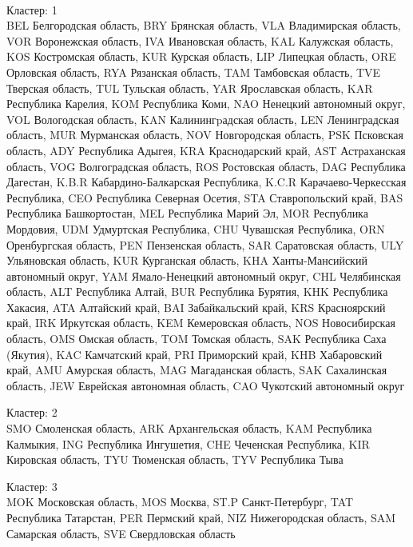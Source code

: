 \documentclass[11pt]{article}
\begin{document}
    \begin{center}
    \end{center}
    { \hspace*{\fill} \\}
    
Кластер:  1 \\
BEL Белгородская область, BRY Брянская область, VLA Владимирская область, VOR Воронежская область, IVA Ивановская область, KAL Калужская область, KOS Костромская область, KUR Курская область, LIP Липецкая область, ORE Орловская область, RYA Рязанская область, TAM Тамбовская область, TVE Тверская область, TUL Тульская область, YAR Ярославская область, KAR Республика Карелия, KOM Республика Коми, NAO Ненецкий автономный округ, VOL Вологодская область, KAN Калинингpадская область, LEN Ленинградская область, MUR Мурманская область, NOV Новгородская область, PSK Псковская область, ADY Республика Адыгея, KRA Краснодарский край, AST Астраханская область, VOG Волгоградская область, ROS Ростовская область, DAG Республика Дагестан, K.B.R Кабардино-Балкарская Республика, K.C.R Карачаево-Черкесская Республика, CEO Республика Северная Осетия, STA Ставропольский край, BAS Республика Башкортостан, MEL Республика Марий Эл, MOR Республика Мордовия, UDM Удмуртская Республика, CHU Чувашская Республика, ORN Оренбургская область, PEN Пензенская область, SAR Саратовская область, ULY Ульяновская область, KUR Курганская область, KHA Ханты-Мансийский автономный округ, YAM Ямало-Ненецкий автономный округ, CHL Челябинская область, ALT Республика Алтай, BUR Республика Бурятия, KHK Республика Хакасия, ATA Алтайский край, BAI Забайкальский край, KRS Красноярский край, IRK Иркутская область, KEM Кемеровская область, NOS Новосибирская область, OMS Омская область, TOM Томская область, SAK Республика Саха (Якутия), KAC Камчатский край, PRI Приморский край, KHB Хабаровский край, AMU Амурская область, MAG Магаданская область, SAK Сахалинская область, JEW Еврейская автономная область, CAO Чукотский автономный округ

Кластер:  2 \\
SMO Смоленская область, ARK Архангельская область, KAM Республика Калмыкия, ING Республика Ингушетия, CHE Чеченская Республика, KIR Кировская область, TYU Тюменская область, TYV Республика Тыва

Кластер:  3 \\
MOK Московская область, MOS Москва, ST.P Санкт-Петербург, TAT Республика Татарстан, PER Пермский край, NIZ Нижегородская область, SAM Самарская область, SVE Свердловская область
\end{document}
